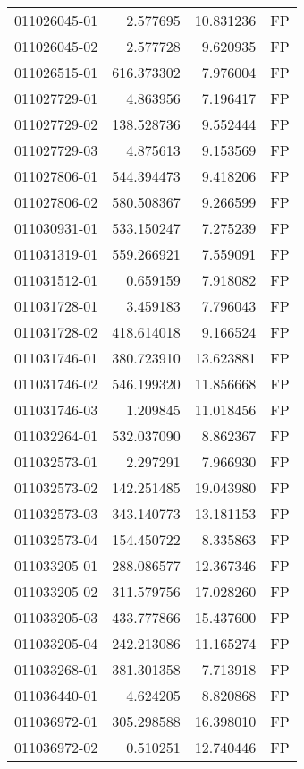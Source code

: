 \begin{tabular}{lrrl}
011026045-01 &    2.577695 &    10.831236 &   FP \\
011026045-02 &    2.577728 &     9.620935 &   FP \\
011026515-01 &  616.373302 &     7.976004 &   FP \\
011027729-01 &    4.863956 &     7.196417 &   FP \\
011027729-02 &  138.528736 &     9.552444 &   FP \\
011027729-03 &    4.875613 &     9.153569 &   FP \\
011027806-01 &  544.394473 &     9.418206 &   FP \\
011027806-02 &  580.508367 &     9.266599 &   FP \\
011030931-01 &  533.150247 &     7.275239 &   FP \\
011031319-01 &  559.266921 &     7.559091 &   FP \\
011031512-01 &    0.659159 &     7.918082 &   FP \\
011031728-01 &    3.459183 &     7.796043 &   FP \\
011031728-02 &  418.614018 &     9.166524 &   FP \\
011031746-01 &  380.723910 &    13.623881 &   FP \\
011031746-02 &  546.199320 &    11.856668 &   FP \\
011031746-03 &    1.209845 &    11.018456 &   FP \\
011032264-01 &  532.037090 &     8.862367 &   FP \\
011032573-01 &    2.297291 &     7.966930 &   FP \\
011032573-02 &  142.251485 &    19.043980 &   FP \\
011032573-03 &  343.140773 &    13.181153 &   FP \\
011032573-04 &  154.450722 &     8.335863 &   FP \\
011033205-01 &  288.086577 &    12.367346 &   FP \\
011033205-02 &  311.579756 &    17.028260 &   FP \\
011033205-03 &  433.777866 &    15.437600 &   FP \\
011033205-04 &  242.213086 &    11.165274 &   FP \\
011033268-01 &  381.301358 &     7.713918 &   FP \\
011036440-01 &    4.624205 &     8.820868 &   FP \\
011036972-01 &  305.298588 &    16.398010 &   FP \\
011036972-02 &    0.510251 &    12.740446 &   FP \\

\end{tabular}
